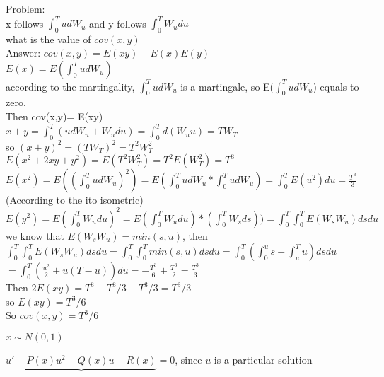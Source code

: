 \documentclass{article}
\begin{document}
Problem: \\

x follows $\int_0^T{u d W_u}$  and y follows $\int_0^T{W_u du}$\\

what is the value of $cov(x,y)$\\

Answer: $cov (x,y)=E(xy)-E(x)E(y)$\\

$E(x)=E(\int_0^T{u d{W_u}})$\\

according to the martingality, $\int_0^T{u d{W_u}}$ is a martingale, so E($\int_0^T{u d{W_u}}$) equals to zero.\\

Then cov(x,y)= E(xy)\\

$x+y=\int_0^{T}{(u dW_u+ W_udu)}=\int_0^{T}{d(W_u u)}=TW_T$\\

so $(x+y)^2=(T W_T)^2= T^2 W_T^2$\\

$E(x^2 + 2xy + y^2)=E(T^2 W_T^2)=T^2E(W_T^2)=T^3$\\

$E(x^2)=E((\int_0^T{u d W_u})^2)=E(\int_0^T{u d W_u}*\int_0^T{u d W_u})=\int_0^T E(u^2)du=\frac{T^3}{3}$(According to the ito isometric)\\

$ E(y^2)=E(\int_0^T{W_u du})^2=E(\int_0^T{W_u du})*(\int_0^T{W_s ds}))=\int_0^T\int_0^T{E(W_s W_u)dsdu}$\\

we know that $E(W_s W_u)=min(s,u)$, then\\

$\int_0^T\int_0^T{E(W_s W_u)}dsdu=\int_0^T\int_0^T min(s,u)dsdu=\int_0^T(\int_0^u s+\int_u^T u)ds du$\\

$=\int_0^T {(\frac{u^2}{2}+u(T-u))du}=-\frac{T^3}{6}+\frac{T^3}{2}=\frac{T^3}{3}$\\

Then $2E(xy)=T^3-T^3/3-T^3/3=T^3/3$\\

so $E(xy)=T^3/6$\\

So $cov (x,y)=T^3/6$

$ x \sim N(0,1)$

$\underbrace{u'-P(x)u^2-Q(x)u-R(x)}=0$, since $u$ is a particular solution


\end{document}
